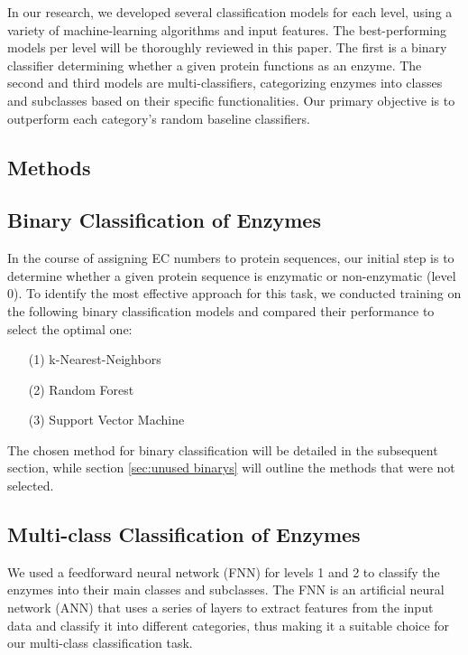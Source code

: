 \documentclass{bioinfo}
\begin{document}
In our research, we developed several classification models for each level, using a variety of machine-learning algorithms and input features.
The best-performing models per level will be thoroughly reviewed in this paper.
The first is a binary classifier determining whether a given protein functions as an enzyme. 
The second and third models are multi-classifiers, categorizing enzymes into classes and subclasses 
based on their specific functionalities. 
Our primary objective is to outperform each category's random baseline classifiers.

\begin{methods}
\section{Methods}

\subsection{Binary Classification of Enzymes}
In the course of assigning EC numbers to protein sequences,
our initial step is to determine whether a given protein sequence is enzymatic or non-enzymatic (level 0).
To identify the most effective approach for this task,
we conducted training on the following binary classification models and compared their performance to select the optimal one:
\begin{enumerate}
	\item[(1)] k-Nearest-Neighbors
	\item[(2)] Random Forest 
	\item[(3)] Support Vector Machine
\end{enumerate}
The chosen method for binary classification will be detailed in the subsequent section, while section \ref{sec:unused binarys} will outline the methods that were not selected.

\subsection{Multi-class Classification of Enzymes}
We used a feedforward neural network (FNN) for levels 1 and 2 to classify the enzymes into their main classes and subclasses.
The FNN is an artificial neural network (ANN) that uses a series of layers to extract features from the input data and classify it into different categories,
thus making it a suitable choice for our multi-class classification task. 


\end{methods}
\end{document}
